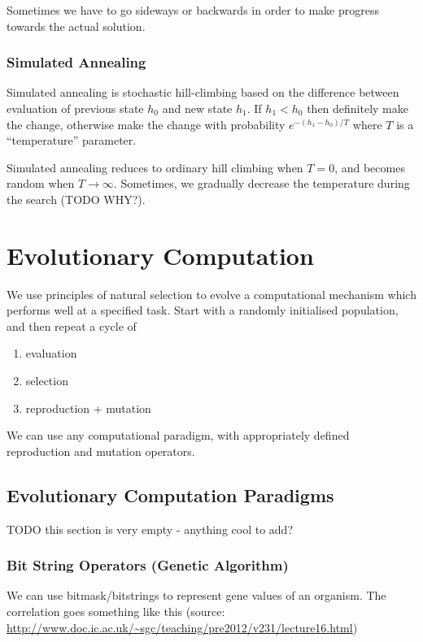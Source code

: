 Sometimes we have to go sideways or backwards in order to make progress towards
the actual solution.

\subsection{Simulated Annealing}
Simulated annealing is stochastic hill-climbing based on the difference between
evaluation of previous state $h_0$ and new state $h_1$. If $h_1 < h_0$ then
definitely make the change, otherwise make the change with probability
$e^{-(h_1-h_0)/T}$ where $T$ is a ``temperature'' parameter.

Simulated annealing reduces to ordinary hill climbing when $T = 0$, and becomes
random when $T \rightarrow \infty$. Sometimes, we gradually decrease the
temperature during the search (TODO WHY?).

\chapter{Evolutionary Computation}
We use principles of natural selection to evolve a computational mechanism
which performs well at a specified task. Start with a randomly initialised
population, and then repeat a cycle of

\begin{enumerate}
    \item evaluation
    \item selection
    \item reproduction + mutation
\end{enumerate}

We can use any computational paradigm, with appropriately defined reproduction
and mutation operators.

\section{Evolutionary Computation Paradigms}
TODO this section is very empty - anything cool to add?

\subsection{Bit String Operators (Genetic Algorithm)}
We can use bitmask/bitstrings to represent gene values of an organism. The
correlation goes something like this (source:
\url{http://www.doc.ic.ac.uk/~sgc/teaching/pre2012/v231/lecture16.html})

